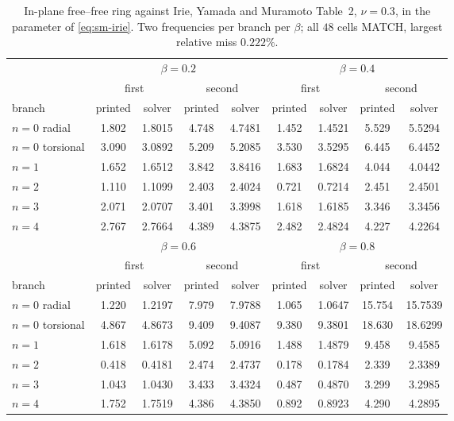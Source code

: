 \documentclass[11pt]{article}
\begin{document}
\begin{center}\footnotesize
\begin{longtable}{lcccccccc}
\caption{In-plane free--free ring against Irie, Yamada and Muramoto Table~2,
$\nu=0.3$, in the parameter of \eqref{eq:sm-irie}. Two frequencies per branch
per $\beta$; all $48$ cells MATCH, largest relative miss $0.222\%$.}
\label{tab:sm-irie}\\
\toprule
& \multicolumn{4}{c}{$\beta=0.2$} & \multicolumn{4}{c}{$\beta=0.4$}\\
\cmidrule(lr){2-5}\cmidrule(lr){6-9}
& \multicolumn{2}{c}{first} & \multicolumn{2}{c}{second}
& \multicolumn{2}{c}{first} & \multicolumn{2}{c}{second}\\
branch & printed & solver & printed & solver
& printed & solver & printed & solver\\
\midrule
$n=0$ radial & 1.802 & 1.8015 & 4.748 & 4.7481 & 1.452 & 1.4521 & 5.529 & 5.5294 \\
$n=0$ torsional & 3.090 & 3.0892 & 5.209 & 5.2085 & 3.530 & 3.5295 & 6.445 & 6.4452 \\
$n=1$ & 1.652 & 1.6512 & 3.842 & 3.8416 & 1.683 & 1.6824 & 4.044 & 4.0442 \\
$n=2$ & 1.110 & 1.1099 & 2.403 & 2.4024 & 0.721 & 0.7214 & 2.451 & 2.4501 \\
$n=3$ & 2.071 & 2.0707 & 3.401 & 3.3998 & 1.618 & 1.6185 & 3.346 & 3.3456 \\
$n=4$ & 2.767 & 2.7664 & 4.389 & 4.3875 & 2.482 & 2.4824 & 4.227 & 4.2264 \\
\midrule
& \multicolumn{4}{c}{$\beta=0.6$} & \multicolumn{4}{c}{$\beta=0.8$}\\
\cmidrule(lr){2-5}\cmidrule(lr){6-9}
& \multicolumn{2}{c}{first} & \multicolumn{2}{c}{second}
& \multicolumn{2}{c}{first} & \multicolumn{2}{c}{second}\\
branch & printed & solver & printed & solver
& printed & solver & printed & solver\\
\midrule
$n=0$ radial & 1.220 & 1.2197 & 7.979 & 7.9788 & 1.065 & 1.0647 & 15.754 & 15.7539 \\
$n=0$ torsional & 4.867 & 4.8673 & 9.409 & 9.4087 & 9.380 & 9.3801 & 18.630 & 18.6299 \\
$n=1$ & 1.618 & 1.6178 & 5.092 & 5.0916 & 1.488 & 1.4879 & 9.458 & 9.4585 \\
$n=2$ & 0.418 & 0.4181 & 2.474 & 2.4737 & 0.178 & 0.1784 & 2.339 & 2.3389 \\
$n=3$ & 1.043 & 1.0430 & 3.433 & 3.4324 & 0.487 & 0.4870 & 3.299 & 3.2985 \\
$n=4$ & 1.752 & 1.7519 & 4.386 & 4.3850 & 0.892 & 0.8923 & 4.290 & 4.2895 \\
\bottomrule
\end{longtable}
\end{center}
\end{document}
